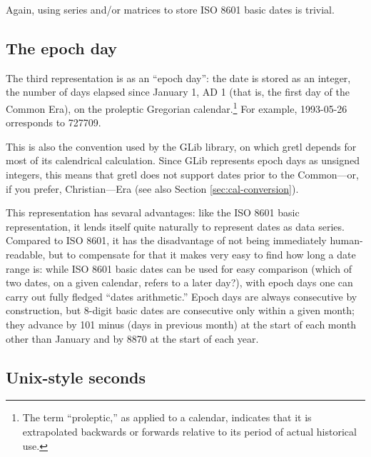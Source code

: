 Again, using series and/or matrices to store ISO 8601 basic dates is
trivial.

\subsection{The epoch day}
\label{sec:cal-epochday}

The third representation is as an ``epoch day'': the date is stored as
an integer, the number of days elapsed since January 1, AD 1 (that is,
the first day of the Common Era), on the proleptic Gregorian
calendar.\footnote{The term ``proleptic,'' as applied to a calendar,
  indicates that it is extrapolated backwards or forwards relative to
  its period of actual historical use.} For example, 1993-05-26
orresponds to 727709.

This is also the convention used by the \textsf{GLib} library, on
which gretl depends for most of its calendrical calculation. Since
\textsf{GLib} represents epoch days as unsigned integers, this means
that gretl does not support dates prior to the Common---or, if you
prefer, Christian---Era (see also Section \ref{sec:cal-conversion}).

This representation has sevaral advantages: like the ISO 8601 basic
representation, it lends itself quite naturally to represent dates as
data series. Compared to ISO 8601, it has the disadvantage of not
being immediately human-readable, but to compensate for that it makes
very easy to find how long a date range is: while ISO 8601 basic dates
can be used for easy comparison (which of two dates, on a given
calendar, refers to a later day?), with epoch days one can carry out
fully fledged ``dates arithmetic.''  Epoch days are always consecutive
by construction, but 8-digit basic dates are consecutive only within a
given month; they advance by 101 minus (days in previous month) at the
start of each month other than January and by 8870 at the start of
each year.


\subsection{Unix-style seconds}
\label{sec:cal-seconds}


